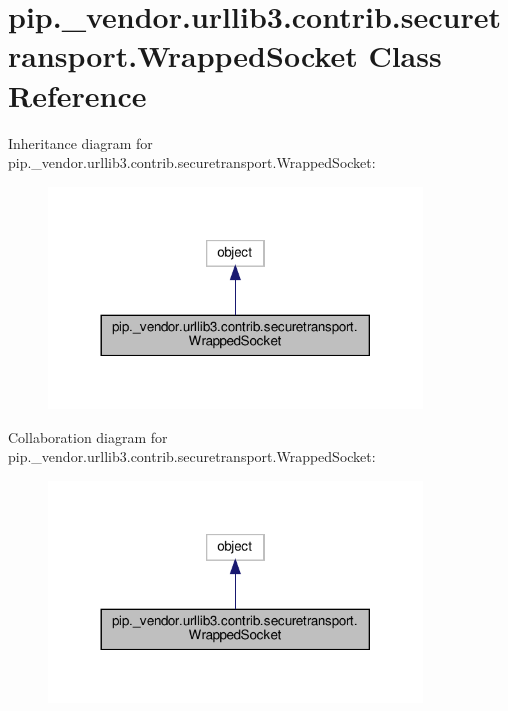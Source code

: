 \hypertarget{classpip_1_1__vendor_1_1urllib3_1_1contrib_1_1securetransport_1_1WrappedSocket}{}\section{pip.\+\_\+vendor.\+urllib3.\+contrib.\+securetransport.\+Wrapped\+Socket Class Reference}
\label{classpip_1_1__vendor_1_1urllib3_1_1contrib_1_1securetransport_1_1WrappedSocket}


Inheritance diagram for pip.\+\_\+vendor.\+urllib3.\+contrib.\+securetransport.\+Wrapped\+Socket\+:
\nopagebreak
\begin{figure}[H]
\begin{center}
\leavevmode
\includegraphics[width=281pt]{classpip_1_1__vendor_1_1urllib3_1_1contrib_1_1securetransport_1_1WrappedSocket__inherit__graph}
\end{center}
\end{figure}


Collaboration diagram for pip.\+\_\+vendor.\+urllib3.\+contrib.\+securetransport.\+Wrapped\+Socket\+:
\nopagebreak
\begin{figure}[H]
\begin{center}
\leavevmode
\includegraphics[width=281pt]{classpip_1_1__vendor_1_1urllib3_1_1contrib_1_1securetransport_1_1WrappedSocket__coll__graph}
\end{center}
\end{figure}
